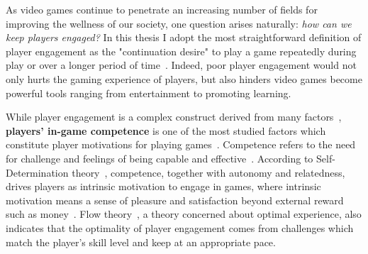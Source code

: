 As video games continue to penetrate an increasing number of fields for improving the wellness of our society, one question arises naturally: \textit{how can we keep players engaged?} In this thesis I adopt the most straightforward definition of player engagement as the "continuation desire" to play a game repeatedly during play or over a longer period of time~\cite{schoenau2011player}. Indeed, poor player engagement would not only hurts the gaming experience of players, but also hinders video games become powerful tools ranging from entertainment to promoting learning. 


While player engagement is a complex construct derived from many factors~\cite{boyle2012engagement,schoenau2011player,choi2004people,brockmyer2009development}, \textbf{players' in-game competence} is one of the most studied factors which constitute player motivations for playing games~\cite{ryan2006motivational,przybylski2010motivational,yee2006motivations,wu2010falling,sherry2006video,lazzaro2004we,schoenau2011player}. Competence refers to the need for challenge and feelings of being capable and effective~\cite{przybylski2010motivational,ryan2006motivational}. According to Self-Determination theory~\cite{przybylski2010motivational,ryan2006motivational}, competence, together with autonomy and relatedness, drives players as intrinsic motivation to engage in games, where intrinsic motivation means a sense of pleasure and satisfaction beyond external reward such as money~\cite{deci1985intrinsic}. Flow  theory~\cite{sweetser2005gameflow,flow1990psychology,chen2007flow}, a theory concerned about optimal experience, also indicates that the optimality of player engagement comes from challenges which match the player's skill level and keep at an appropriate pace. 





